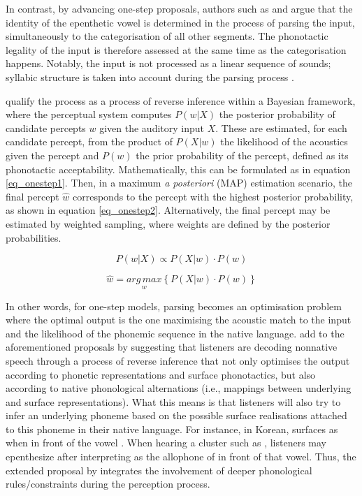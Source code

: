 In contrast, by advancing one-step proposals, authors such as \cite{dupoux2011, dejong2012} and \cite{wilson2013} argue that the identity of the epenthetic vowel is determined in the process of parsing the input, simultaneously to the categorisation of all other segments. The phonotactic legality of the input is therefore assessed at the same time as the categorisation happens. Notably, the input is not processed as a linear sequence of sounds; syllabic structure is taken into account during the parsing process \cite{kabak2007}.

\cite{wilson2013} qualify the process as a process of reverse inference within a Bayesian framework, where the perceptual system computes $P(w | X)$ the posterior probability of candidate percepts $w$ given the auditory input $X$. These are estimated, for each candidate percept, from the product of $P(X|w)$ the likelihood of the acoustics given the percept and $P(w)$ the prior probability of the percept, defined as its phonotactic acceptability. Mathematically, this can be formulated as in equation \ref{eq_onestep1}. Then, in a maximum \textit{a posteriori} (MAP) estimation scenario, the final percept $\widehat{w}$ corresponds to the percept with the highest posterior probability, as shown in equation \ref{eq_onestep2}. Alternatively, the final percept may be estimated by weighted sampling, where weights are defined by the posterior probabilities.     

\begin{equation}
  P(w | X) \propto P(X | w) \cdot P(w)
  \label{eq_onestep1}
\end{equation}

\begin{equation}
  \widehat{w} = \underset{w}{arg\,max} \left \{ P(X|w) \cdot P(w) \right \}
  \label{eq_onestep2}
\end{equation}

In other words, for one-step models, parsing becomes an optimisation problem where the optimal output is the one maximising the acoustic match to the input and the likelihood of the phonemic sequence in the native language. \cite{durvasula2015} add to the aforementioned proposals by suggesting that listeners are decoding nonnative speech through a process of reverse inference that not only optimises the output according to phonetic representations and surface phonotactics, but also according to native phonological alternations (i.e., mappings between underlying and surface representations). What this means is that listeners will also try to infer an underlying phoneme based on the possible surface realisations attached to this phoneme in their native language. For instance, in Korean,  surfaces as \textipa{[S]} when in front of the vowel . When hearing a cluster such as \textipa{[Sm]}, listeners may epenthesize \textipa{[i]} after interpreting \textipa{[S]} as the allophone of  in front of that vowel. Thus, the extended proposal by \cite{durvasula2015} integrates the involvement of deeper phonological rules/constraints during the perception process. 

